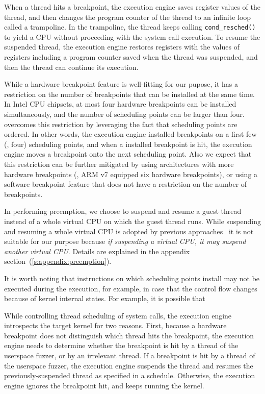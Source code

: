 When a thread hits a breakpoint, the execution engine saves register
values of the thread, and then changes the program counter of the
thread to an infinite loop called a trampoline.
%
In the trampoline, the thread keeps calling \texttt{cond_resched()} to
yield a CPU without proceeding with the system call execution.
%
To resume the suspended thread, the execution engine restores
registers with the values of registers including a program counter
saved when the thread was suspended, and then the thread can continue
its execution.


%
While a hardware breakpoint feature is well-fitting for our pupose, it
has a restriction on the number of breakpoints that can be installed
at the same time.
%
In Intel CPU chipsets, at most four hardware breakpoints can be
installed simultaneously, and the number of scheduling points can be
larger than four.
%
\dr{} \sys overcomes this restriction by leveraging the fact that
scheduling points are ordered. In other words, the execution engine
installed breakpoints on a first few (\eg, four) scheduling points,
and when a installed breakpoint is hit, the execution engine moves a
breakpoint onto the next scheduling point.
%
Also we expect that this restriction can be further mitigated by using
architectures with more hardware breakpoints (\eg, ARM v7 equipped six
hardware breakpoints), or using a software breakpoint feature that
does not have a restriction on the number of breakpoints.



%
In performing preemption, we choose to suspend and resume a guest
thread instead of a whole virtual CPU on which the guest thread runs.
%
While suspending and resuming a whole virtual CPU is adopted by
previous approaches~\cite{ski, snowboard, razzer} it is not suitable
for our purpose because \textit{if suspending a virtual CPU, it may
  suspend another virtual CPU}. Details are explained in the appendix
section~(\autoref{s:appendix:preemption}).




%
It is worth noting that instructions on which scheduling points
install may not be executed during the execution, for example, in case
that the control flow changes because of kernel internal states.
%
For example, it is possible that

\dr{}




%
While controlling thread scheduling of system calls, the execution
engine introspects the target kernel for two reasons.
%
First, because a hardware breakpoint does not distinguish which thread
hits the breakpoint, the execution engine needs to determine whether
the breakpoint is hit by a thread of the userspace fuzzer, or by an
irrelevant thread.
%
If a breakpoint is hit by a thread of the userspace fuzzer, the
execution engine suspends the thread and resumes the
previously-suspended thread as specified in a schedule.
%
Otherwise, the execution engine ignores the breakpoint hit, and keeps
running the kernel.


